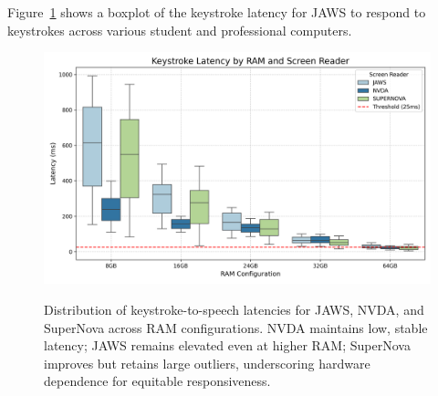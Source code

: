 Figure~\ref{fig:figure2} shows a boxplot of the keystroke latency for JAWS to respond to keystrokes across various student and professional computers.
\begin{figure}[htbp]
	\includegraphics[alt={Boxplots of keystroke response latency (ms) for JAWS, NVDA, SuperNova across RAM tiers; NVDA lowest median and variance, JAWS highest, SuperNova intermediate with wide spread.}]{images/keystroke_latency.png}
	\caption[Keystroke response latency by RAM]{Distribution of keystroke-to-speech latencies for JAWS, NVDA, and SuperNova across RAM configurations. NVDA maintains low, stable latency; JAWS remains elevated even at higher RAM; SuperNova improves but retains large outliers, underscoring hardware dependence for equitable responsiveness.}\label{fig:figure2}
	\tagstructend
\end{figure}

